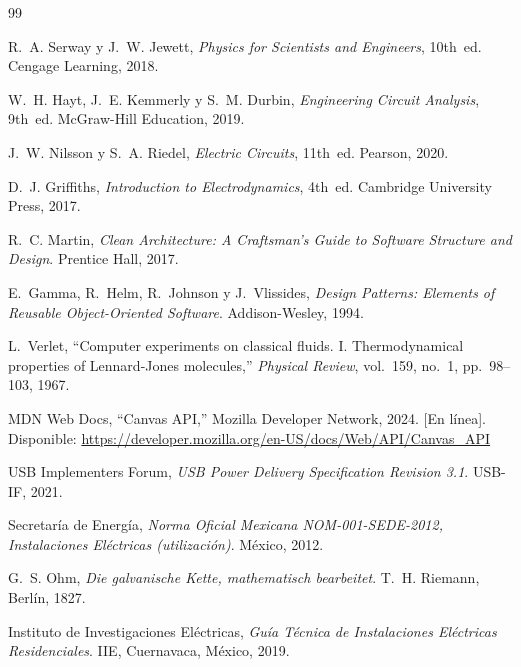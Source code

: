 \documentclass[12pt, a4paper]{article}
\begin{document}
\begin{thebibliography}{99}

R.~A. Serway y J.~W. Jewett,
\textit{Physics for Scientists and Engineers}, 10th~ed.
Cengage Learning, 2018.

W.~H. Hayt, J.~E. Kemmerly y S.~M. Durbin,
\textit{Engineering Circuit Analysis}, 9th~ed.
McGraw-Hill Education, 2019.

J.~W. Nilsson y S.~A. Riedel,
\textit{Electric Circuits}, 11th~ed.
Pearson, 2020.

D.~J. Griffiths,
\textit{Introduction to Electrodynamics}, 4th~ed.
Cambridge University Press, 2017.

R.~C. Martin,
\textit{Clean Architecture: A Craftsman's Guide to Software Structure and Design}.
Prentice Hall, 2017.

E.~Gamma, R.~Helm, R.~Johnson y J.~Vlissides,
\textit{Design Patterns: Elements of Reusable Object-Oriented Software}.
Addison-Wesley, 1994.

L.~Verlet,
``Computer experiments on classical fluids. I. Thermodynamical properties of Lennard-Jones molecules,''
\textit{Physical Review}, vol.~159, no.~1, pp.~98--103, 1967.

MDN Web Docs,
``Canvas API,''
Mozilla Developer Network, 2024.
[En línea]. Disponible: \url{https://developer.mozilla.org/en-US/docs/Web/API/Canvas_API}

USB Implementers Forum,
\textit{USB Power Delivery Specification Revision 3.1}.
USB-IF, 2021.

Secretaría de Energía,
\textit{Norma Oficial Mexicana NOM-001-SEDE-2012, Instalaciones Eléctricas (utilización)}.
México, 2012.

G.~S. Ohm,
\textit{Die galvanische Kette, mathematisch bearbeitet}.
T.~H. Riemann, Berlín, 1827.

Instituto de Investigaciones Eléctricas,
\textit{Guía Técnica de Instalaciones Eléctricas Residenciales}.
IIE, Cuernavaca, México, 2019.

\end{thebibliography}
\end{document}
